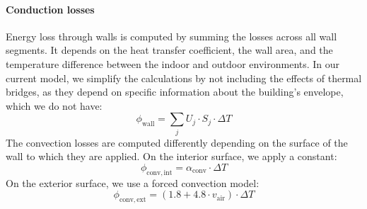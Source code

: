 \documentclass[runningheads]{llncs}
\begin{document}
\paragraph{Conduction losses} Energy loss through walls is computed by summing the losses across all wall segments. It depends on the heat transfer coefficient, the wall area, and the temperature difference between the indoor and outdoor environments. In our current model, we simplify the calculations by not including the effects of thermal bridges, as they depend on specific information about the building's envelope, which we do not have:
\begin{equation}
  \phi_{\mathrm{wall}} = \sum_{j} U_j \cdot S_j \cdot \Delta T
\end{equation}
The convection losses are computed differently depending on the surface of the wall to which they are applied. On the interior surface, we apply a constant:
\begin{equation}
  \phi_{\mathrm{conv,int}} = \alpha_{\mathrm{conv}} \cdot \Delta T
\end{equation}
On the exterior surface, we use a forced convection model:
\begin{equation}
  \phi_{\mathrm{conv,ext}} = \left( 1.8 + 4.8 \cdot v_{\mathrm{air}} \right) \cdot \Delta T
\end{equation}
\end{document}
